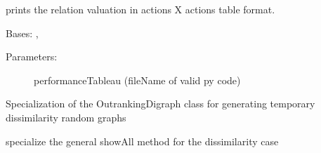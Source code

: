 \documentclass[letterpaper,10pt,english]{sphinxmanual}
\begin{document}
\begin{fulllineitems}
\begin{fulllineitems}
\end{fulllineitems}


\begin{fulllineitems}
\label{techDoc:outrankingDigraphs.ConfidentBipolarOutrankingDigraph.showRelationTable}
prints the relation valuation in actions X actions table format.

\end{fulllineitems}


\end{fulllineitems}


\begin{fulllineitems}
\label{techDoc:outrankingDigraphs.DissimilarityOutrankingDigraph}
Bases: {\hyperref[techDoc:outrankingDigraphs.OutrankingDigraph]{\emph{}}}, {\hyperref[techDoc:perfTabs.PerformanceTableau]{\emph{}}}
\begin{description}
\item[{Parameters:}] \leavevmode
performanceTableau (fileName of valid py code)

\end{description}

Specialization of the OutrankingDigraph class for generating
temporary dissimilarity random graphs

\begin{fulllineitems}
\label{techDoc:outrankingDigraphs.DissimilarityOutrankingDigraph.showAll}
specialize the general showAll method for the dissimilarity case

\end{fulllineitems}


\end{fulllineitems}
\end{document}
